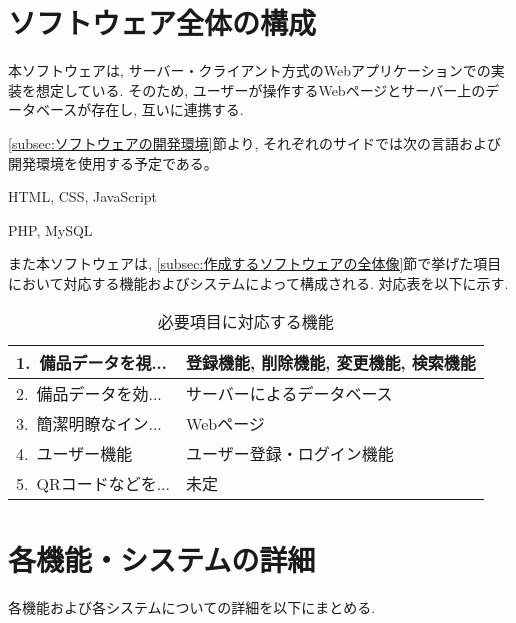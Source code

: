 \documentclass[11ptm]{jsarticle}
\begin{document}
\section{ソフトウェア全体の構成}
\label{sec:ソフトウェア全体の構成}
本ソフトウェアは, サーバー・クライアント方式のWebアプリケーションでの実装を想定している. そのため, ユーザーが操作するWebページとサーバー上のデータベースが存在し, 互いに連携する. \par
\ref{subsec:ソフトウェアの開発環境}節より, それぞれのサイドでは次の言語および開発環境を使用する予定である。
\begin{description}[labelwidth=15em]
  \item[クライアントサイド(Webページ)] HTML, CSS, JavaScript
  \item[サーバーサイド] PHP, MySQL
\end{description}
また本ソフトウェアは, \ref{subsec:作成するソフトウェアの全体像}節で挙げた項目において対応する機能およびシステムによって構成される. 対応表を以下に示す.
\begin{table}[h]
  \caption{必要項目に対応する機能}
  \label{tb:必要項目に対応する機能}
  \centering
  \begin{tabularx}{\linewidth}{l|l}
    1.\ 備品データを視... & 登録機能, 削除機能, 変更機能, 検索機能 \\
    \hline
    2.\ 備品データを効... & サーバーによるデータベース             \\
    \hline
    3.\ 簡潔明瞭なイン... & Webページ                              \\
    \hline
    4.\ ユーザー機能      & ユーザー登録・ログイン機能             \\
    \hline
    5.\ QRコードなどを... & 未定                                   \\
  \end{tabularx}
\end{table}


\newpage
\section{各機能・システムの詳細}
\label{sec:各機能の詳細・システムの詳細}
各機能および各システムについての詳細を以下にまとめる.

\end{document}
